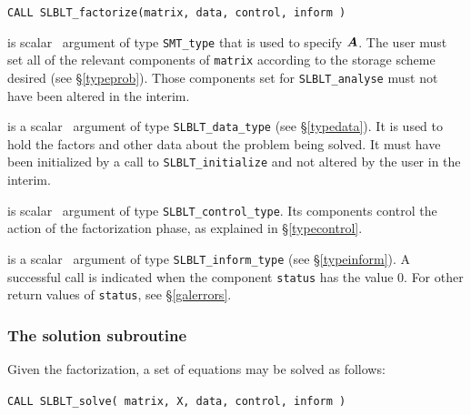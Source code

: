 \documentclass{galahad}
\newcommand{\packagename}{SLBLT}
\begin{document}
\hskip0.5in
{\tt CALL \packagename\_factorize(matrix, data, control, inform )}

\begin{description}

 is scalar \intentin\ argument of type {\tt SMT\_type}
that is used to specify ${\bm{A}}$.
The user must set all of the relevant components of {\tt matrix} according
to the storage scheme desired (see \S\ref{typeprob}). Those components
set for {\tt \packagename\_analyse} must not have been altered in the interim.

 is a scalar \intentinout\ argument of type
{\tt \packagename\_data\_type}
(see \S\ref{typedata}). It is used to hold the factors and other
data about the problem being solved.
It must have been initialized by a call to
{\tt \packagename\_ini\-tialize} and not altered by the user in the interim.

 is scalar \intentin\ argument of type
{\tt \packagename\_control\_type}. Its components control the action
of the factorization phase, as explained in
\S\ref{typecontrol}.

 is a scalar \intentinout\ argument of type
{\tt \packagename\_inform\_type}
(see \S\ref{typeinform}).
A successful call is indicated when the  component {\tt status} has the value 0.
For other return values of {\tt status}, see \S\ref{galerrors}.

\end{description}


\subsubsection{The solution subroutine}
\label{solve}
Given the factorization, a set of equations may be solved as follows:

\hskip0.5in
{\tt CALL \packagename\_solve( matrix, X, data, control, inform )}
\end{document}
